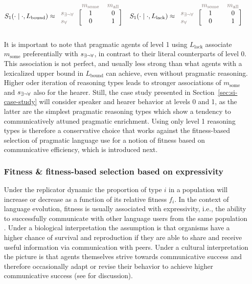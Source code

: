 \documentclass[a4paper, 11pt]{article}
\theoremstyle{Satz}
\newcommand{\state}{\ensuremath{s}\xspace}		%
\newcommand{\mystate}[1]{\ensuremath{\state_{\text{#1}}}\xspace} %
\newcommand{\mylang}[1]{\ensuremath{L_{\text{#1}}}\xspace} %
\newcommand{\messg}{\ensuremath{m}\xspace}		%
\newcommand{\mymessg}[1]{\ensuremath{\messg_{\text{#1}}}\xspace} %
\newcommand{\ssome}{\mystate{\ensuremath{\exists\neg\forall}}}
\newcommand{\sall}{\mystate{\ensuremath{\forall}}}
\newcommand{\msome}{\mymessg{some}}
\newcommand{\mall}{\mymessg{all}}
\newcommand{\Lbound}{\mylang{bound}}
\newcommand{\Llack}{\mylang{lack}}
\newcommand{\mygray}[1]{{\textcolor{mygray}{#1}}}
\begin{document}
\begin{align*}
  S_1(\cdot \mid \cdot, \Lbound) & \approx \begin{blockarray}{lcc}
    & \mygray{\msome} & \mygray{\mall} \\
    \begin{block}{l[cc]}
      \mygray{\ssome} & 1 & 0 \\
      \mygray{\sall}  & 0 & 1 \\
    \end{block}
  \end{blockarray} &
  S_1(\cdot \mid \cdot, \Llack) & \approx \begin{blockarray}{lcc}
    & \mygray{\msome} & \mygray{\mall} \\
    \begin{block}{l[cc]}
      \mygray{\ssome} & 1 & 0 \\
      \mygray{\sall}  & 0 & 1 \\
    \end{block}
  \end{blockarray} 
\end{align*}

It is important to note that pragmatic agents of level 1 using $\Llack$ associate $\msome$
preferentially with $\ssome$, in contrast to their literal counterparts of level 0. This
association is not perfect, and usually less strong than what agents with a lexicalized upper
bound in $\Lbound$ can achieve, even without pragmatic reasoning. Higher oder iteration of
reasoning types leads to stronger associations of $\msome$ and $\ssome$ also for the
hearer. Still, the case study presented in Section~\ref{sec:si-case-study} will consider
speaker and hearer behavior at levels 0 and 1, as the latter are the simplest pragmatic
reasoning types which show a tendency to communicatively attuned pragmatic enrichment. Using
only level 1 reasoning types is therefore a conservative choice that works against the
fitness-based selection of pragmatic language use for a notion of fitness based on
communicative efficiency, which is introduced next.

\subsubsection{Fitness \& fitness-based selection based on expressivity}\label{sec:expressivity}

Under the replicator dynamic the proportion of type $i$ in a population will increase or
decrease as a function of its relative fitness $f_i$. In the context of language evolution,
fitness is usually associated with expressivity, i.e., the ability to successfully communicate
with other language users from the same population
\citep[e.g.,][]{nowak+krakauer:1999,nowak+etal:2000, nowak+etal:2002}. Under a biological
interpretation the assumption is that organisms have a higher chance of survival and
reproduction if they are able to share and receive useful information via communication with
peers. Under a cultural interpretation the picture is that agents themselves strive towards
communicative success and therefore occasionally adapt or revise their behavior to achieve
higher communicative success (see \citealt[\S3.3]{benz+etal:2005b} for discussion).
\end{document}
